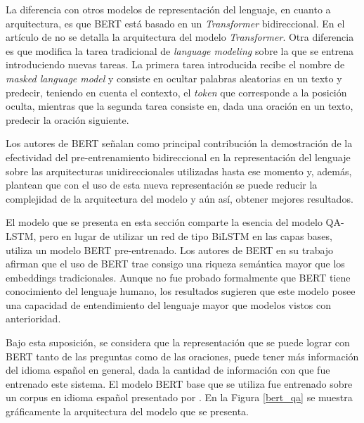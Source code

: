 La diferencia con otros modelos de representación del lenguaje, en cuanto a arquitectura, es que BERT está basado en un \textit{Transformer} bidireccional. En el artículo de \cite{2018-devlin-bert} no se detalla la arquitectura del modelo \textit{Transformer}. Otra diferencia es que modifica la tarea tradicional de \textit{language modeling} sobre la que se entrena introduciendo nuevas tareas. La primera tarea introducida recibe el nombre de \textit{masked language model} y consiste en ocultar palabras aleatorias en un texto y predecir, teniendo en cuenta el contexto, el \textit{token} que corresponde a la posición oculta, mientras que la segunda tarea consiste en, dada una oración en un texto, predecir la oración siguiente.

Los autores de BERT señalan como principal contribución la demostración de la efectividad del pre-entrenamiento bidireccional en la representación del lenguaje sobre las arquitecturas unidireccionales utilizadas hasta ese momento y, además, plantean que con el uso de esta nueva representación se puede reducir la complejidad de la arquitectura del modelo y aún así, obtener mejores resultados.

El modelo que se presenta en esta sección comparte la esencia del modelo QA-LSTM, pero en lugar de utilizar un red de tipo BiLSTM en las capas bases, utiliza un modelo BERT pre-entrenado. Los autores de BERT en su trabajo \cite{2018-devlin-bert} afirman que el uso de BERT trae consigo una riqueza semántica mayor que los embeddings tradicionales. Aunque no fue probado formalmente que BERT tiene conocimiento del lenguaje humano, los resultados sugieren que este modelo posee una capacidad de entendimiento del lenguaje mayor que modelos vistos con anterioridad.

Bajo esta suposición, se considera que la representación que se puede lograr con BERT tanto de las preguntas como de las oraciones, puede tener más información del idioma español en general, dada la cantidad de información con que fue entrenado este sistema. El modelo BERT base que se utiliza fue entrenado sobre un corpus en idioma español presentado por \cite{2020-spanish-bert}. En la Figura \ref{bert_qa} se muestra gráficamente la arquitectura del modelo que se presenta.

